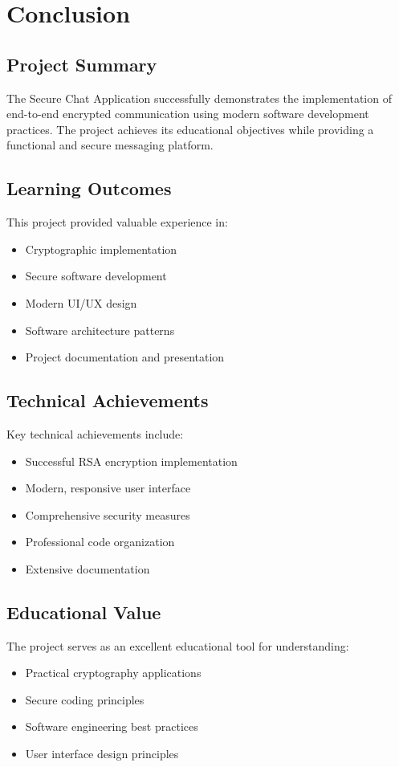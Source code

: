 \documentclass[12pt,a4paper]{article}
\begin{document}
\section{Conclusion}

\subsection{Project Summary}
The Secure Chat Application successfully demonstrates the implementation of end-to-end encrypted communication using modern software development practices. The project achieves its educational objectives while providing a functional and secure messaging platform.

\subsection{Learning Outcomes}
This project provided valuable experience in:
\begin{itemize}
    \item Cryptographic implementation
    \item Secure software development
    \item Modern UI/UX design
    \item Software architecture patterns
    \item Project documentation and presentation
\end{itemize}

\subsection{Technical Achievements}
Key technical achievements include:
\begin{itemize}
    \item Successful RSA encryption implementation
    \item Modern, responsive user interface
    \item Comprehensive security measures
    \item Professional code organization
    \item Extensive documentation
\end{itemize}

\subsection{Educational Value}
The project serves as an excellent educational tool for understanding:
\begin{itemize}
    \item Practical cryptography applications
    \item Secure coding principles
    \item Software engineering best practices
    \item User interface design principles
\end{itemize}
\end{document}
